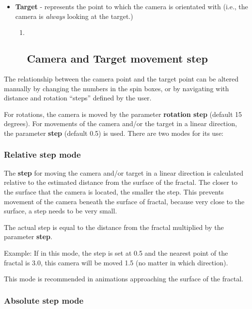 \begin{itemize}
\item
  \textbf{Target} - represents the point to which the camera is
  orientated with (i.e., the camera is \emph{always} looking at the
  target.)

  \begin{enumerate}
  \def\labelenumi{\arabic{enumi}.}
  \item ~
    \subsection{Camera and Target movement
    step}\label{camera-and-target-movement-step}
  \end{enumerate}
\end{itemize}

The relationship between the camera point and the target point can be
altered manually by changing the numbers in the spin boxes, or by
navigating with distance and rotation ``steps'' defined by the user.

For rotations, the camera is moved by the parameter \textbf{rotation
step} (default 15 degrees). For movements of the camera and/or the
target in a linear direction, the parameter \textbf{step} (default 0.5)
is used. There are two modes for its use:

\subsubsection{Relative step mode}\label{relative-step-mode}

The \textbf{step} for moving the camera and/or target in a linear
direction is calculated relative to the estimated distance from the
surface of the fractal. The closer to the surface that the camera is
located, the smaller the step. This prevents movement of the camera
beneath the surface of fractal, because very close to the surface, a
step needs to be very small.

The actual step is equal to the distance from the fractal multiplied by
the parameter \textbf{step}.

Example: If in this mode, the step is set at 0.5 and the nearest point
of the fractal is 3.0, this camera will be moved 1.5 (no matter in which
direction).

This mode is recommended in animations approaching the surface of the
fractal.

\subsubsection{Absolute step mode}\label{absolute-step-mode}

